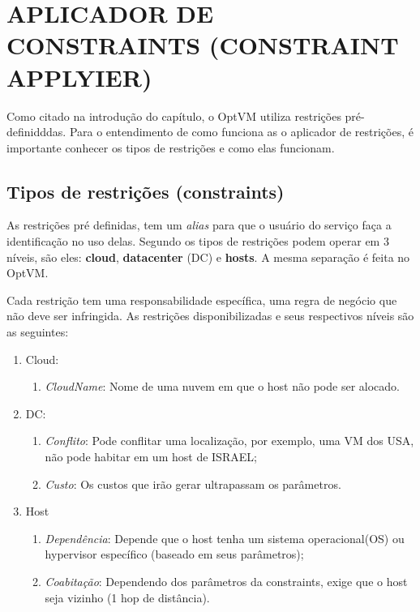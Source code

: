 \section{APLICADOR DE CONSTRAINTS (CONSTRAINT APPLYIER)}

Como citado na introdução do capítulo, o OptVM utiliza restrições pré-definidddas.
Para o entendimento de como funciona as o aplicador de restrições, é importante conhecer os tipos de 
restrições e como elas funcionam.

\subsection{Tipos de restrições (constraints)}

As restrições pré definidas, tem um \textit{alias} para que o usuário do serviço faça a identificação no uso delas.
Segundo \cite{saber2015towards} os tipos de restrições podem operar em 3 níveis, 
são eles: \textbf{cloud}, \textbf{datacenter} (DC) e \textbf{hosts}. A mesma separação é 
feita no OptVM.

Cada restrição tem uma responsabilidade específica, uma regra de negócio que não deve ser infringida. 
As restrições disponibilizadas e seus respectivos níveis são as seguintes:

\begin{enumerate}
  \item Cloud:
  \begin{enumerate}
    \item \textit{CloudName}: Nome de uma nuvem em que o host não pode ser alocado.
  \end{enumerate}

  \item DC:
  \begin{enumerate}
    \item \textit{Conflito}: Pode conflitar uma localização, por exemplo, uma VM dos USA, não pode habitar em um host de ISRAEL;
    \item \textit{Custo}: Os custos que irão gerar ultrapassam os parâmetros.
  \end{enumerate}

 \item Host
  \begin{enumerate}
    \item \textit{Dependência}: Depende que o host tenha um sistema operacional(OS) ou hypervisor específico (baseado em seus parâmetros);
    \item \textit{Coabitação}: Dependendo dos parâmetros da constraints, exige que o host seja vizinho (1 hop de distância).
  \end{enumerate}
  
\end{enumerate}

